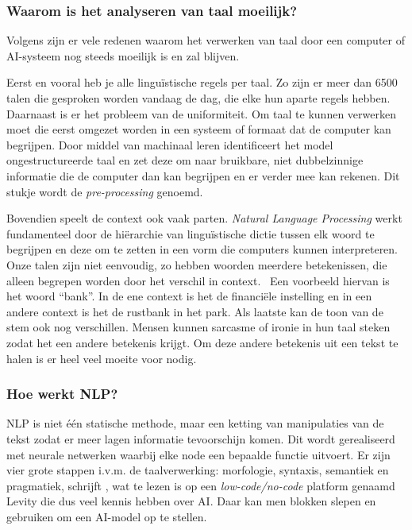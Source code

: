 \subsubsection{Waarom is het analyseren van taal moeilijk?}
Volgens \textcite{Kleinings2022} zijn er vele redenen waarom het verwerken van taal door een computer of AI-systeem nog steeds moeilijk is en zal blijven.

Eerst en vooral heb je alle linguïstische regels per taal. Zo zijn er meer dan 6500 talen die gesproken worden vandaag de dag, die elke hun aparte regels hebben.
Daarnaast is er het probleem van de uniformiteit. Om taal te kunnen verwerken moet die eerst omgezet worden in een systeem of formaat dat de computer kan begrijpen. Door middel van machinaal leren identificeert het model ongestructureerde taal en zet deze om naar bruikbare, niet dubbelzinnige informatie die de computer dan kan begrijpen en er verder mee kan rekenen. Dit stukje wordt de \textit{pre-processing} genoemd.

Bovendien speelt de context ook vaak parten. \textit{Natural Language Processing} werkt fundamenteel door de hiërarchie van linguïstische dictie tussen elk woord te begrijpen en deze om te zetten in een vorm die computers kunnen interpreteren. Onze talen zijn niet eenvoudig, zo hebben woorden meerdere betekenissen, die alleen begrepen worden door het verschil in context.~\autocite{Kleinings2022} Een voorbeeld hiervan is het woord ``bank''. In de ene context is het de financiële instelling en in een andere context is het de rustbank in het park.
Als laatste kan de toon van de stem ook nog verschillen. Mensen kunnen sarcasme of ironie in hun taal steken zodat het een andere betekenis krijgt. Om deze andere betekenis uit een tekst te halen is er heel veel moeite voor nodig.

\subsubsection{Hoe werkt NLP?}
NLP is niet één statische methode, maar een ketting van manipulaties van de tekst zodat er meer lagen informatie tevoorschijn komen. Dit wordt gerealiseerd met neurale netwerken waarbij elke node een bepaalde functie uitvoert.
Er zijn vier grote stappen i.v.m. de taalverwerking: morfologie, syntaxis, semantiek en pragmatiek, schrijft \textcite{Kleinings2022}, wat te lezen is op een \textit{low-code/no-code} platform genaamd Levity die dus veel kennis hebben over AI. Daar kan men blokken slepen en gebruiken om een AI-model op te stellen.

